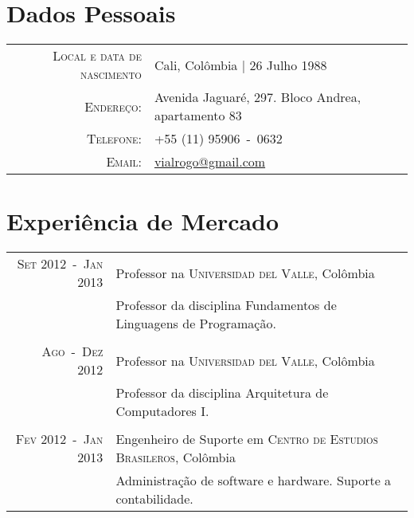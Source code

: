\documentclass[a4paper,10pt]{article}
\begin{document}
\pagestyle{empty} %

\par{\bigskip\par}

\section{Dados Pessoais}

\begin{tabular}{rl}
  \textsc{Local e data de nascimento} & Cali, Colômbia  | 26 Julho 1988 \\
  \textsc{Endereço:}                  & Avenida Jaguaré, 297. Bloco Andrea, apartamento 83 \\
  \textsc{Telefone:}                  & +55 (11) 95906~-~0632 \\
  \textsc{Email:}                     & \href{mailto:vialrogo@gmail.com}{vialrogo@gmail.com} \\
\end{tabular}

\section{Experiência de Mercado}
\begin{tabular}{rl}

  \textsc{Set 2012~-~Jan 2013}  & Professor na \textsc{Universidad del Valle}, Colômbia \\
                                &\footnotesize{Professor da disciplina Fundamentos de Linguagens de Programação.} \\
                                &\\

  \textsc{Ago~-~Dez 2012}       & Professor na \textsc{Universidad del Valle}, Colômbia \\
                                &\footnotesize{Professor da disciplina Arquitetura de Computadores I.} \\
                                &\\

  \textsc{Fev 2012~-~Jan 2013}  & Engenheiro de Suporte em \textsc{Centro de Estudios Brasileros}, Colômbia \\
                                &\footnotesize{Administração de software e hardware. Suporte a contabilidade.} \\

\end{tabular}
\end{document}
